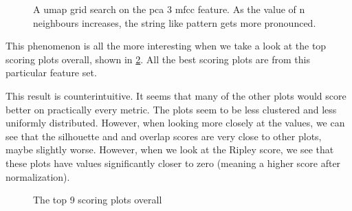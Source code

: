 \documentclass[11pt]{article}
\begin{document}
\begin{figure}[h!tbp]
\centering
{}
\caption{A umap grid search on the pca 3 mfcc feature. As the value of n neighbours increases, the string like pattern gets more pronounced.}
\label{fig:umap_3d_pca_grid_search}
\end{figure}

This phenomenon is all the more interesting when we take a look at the top scoring plots overall, shown in \ref{fig:top_overall}. All the best scoring plots are from this particular feature set.

This result is counterintuitive. It seems that many of the other plots would score better on practically every metric. The plots seem to be less clustered and less uniformly distributed. However, when looking more closely at the values, we can see that the silhouette and and overlap scores are very close to other plots, maybe slightly worse. However, when we look at the Ripley score, we see that these plots have values significantly closer to zero (meaning a higher score after normalization).

\begin{figure}[htbp]
\centering
{}
\caption{The top 9 scoring plots overall}
\label{fig:top_overall}
\end{figure}
\end{document}
